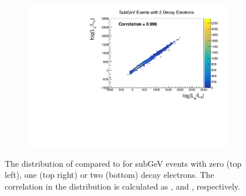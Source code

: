 \begin{figure}[h]
\begin{subfigure}[t]{0.49\textwidth}
    \includegraphics[width=\textwidth, trim={0mm 0mm 0mm 0mm}, clip,page=1]{Figures/Selections/Correlation_SG2Dcy.pdf}
  \end{subfigure}
  \caption{The distribution of  compared to  for subGeV events with zero (top left), one (top right) or two (bottom) decay electrons. The correlation in the distribution is calculated as ,  and , respectively.}
  \label{fig:SelsAndSysts_LLHCorrelation}
\end{figure}

